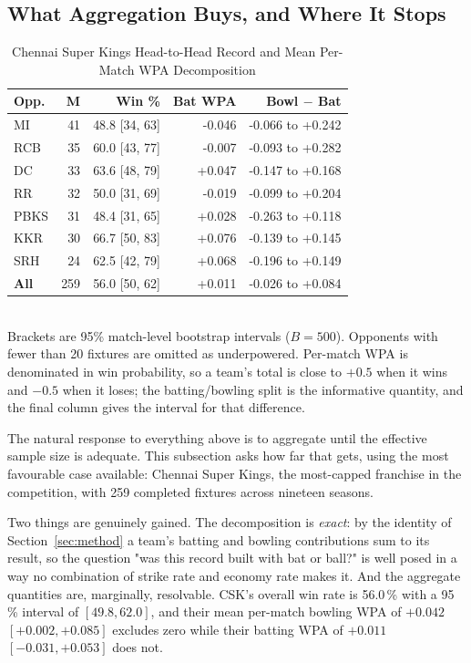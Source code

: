 \documentclass[conference]{IEEEtran}
\begin{document}
\subsection{What Aggregation Buys, and Where It Stops}
\label{sec:res-h2h}

\begin{table}[htbp]
\caption{Chennai Super Kings Head-to-Head Record and Mean Per-Match WPA Decomposition}
\label{tab:h2h}
\centering
\begin{tabular}{lrrrr}
\toprule
\textbf{Opp.} & \textbf{M} & \textbf{Win \%} & \textbf{Bat WPA} & \textbf{Bowl $-$ Bat} \\
\midrule
MI & 41 & 48.8 [34, 63] & -0.046 & -0.066 to +0.242 \\
RCB & 35 & 60.0 [43, 77] & -0.007 & -0.093 to +0.282 \\
DC & 33 & 63.6 [48, 79] & +0.047 & -0.147 to +0.168 \\
RR & 32 & 50.0 [31, 69] & -0.019 & -0.099 to +0.204 \\
PBKS & 31 & 48.4 [31, 65] & +0.028 & -0.263 to +0.118 \\
KKR & 30 & 66.7 [50, 83] & +0.076 & -0.139 to +0.145 \\
SRH & 24 & 62.5 [42, 79] & +0.068 & -0.196 to +0.149 \\
\midrule
\textbf{All} & 259 & 56.0 [50, 62] & +0.011 & -0.026 to +0.084 \\
\bottomrule
\end{tabular}
\\[2pt]\footnotesize Brackets are 95\% match-level bootstrap intervals
($B=500$). Opponents with fewer than 20 fixtures are omitted as
underpowered. Per-match WPA is denominated in win probability, so a
team's total is close to $+0.5$ when it wins and $-0.5$ when it loses;
the batting/bowling split is the informative quantity, and the final
column gives the interval for that difference.
\end{table}

The natural response to everything above is to aggregate until the
effective sample size is adequate. This subsection asks how far that
gets, using the most favourable case available: Chennai Super Kings, the
most-capped franchise in the competition, with 259 completed fixtures
across nineteen seasons.

Two things are genuinely gained. The decomposition is \emph{exact}: by
the identity of Section~\ref{sec:method} a team's batting and bowling
contributions sum to its result, so the question "was this record built
with bat or ball?" is well posed in a way no combination of strike rate
and economy rate makes it. And the aggregate quantities are, marginally,
resolvable. CSK's overall win rate is 56.0\,\% with a 95\,\% interval of
$[49.8, 62.0]$, and their mean per-match bowling WPA of $+0.042$
$[+0.002, +0.085]$ excludes zero while their batting WPA of $+0.011$
$[-0.031, +0.053]$ does not.
\end{document}
